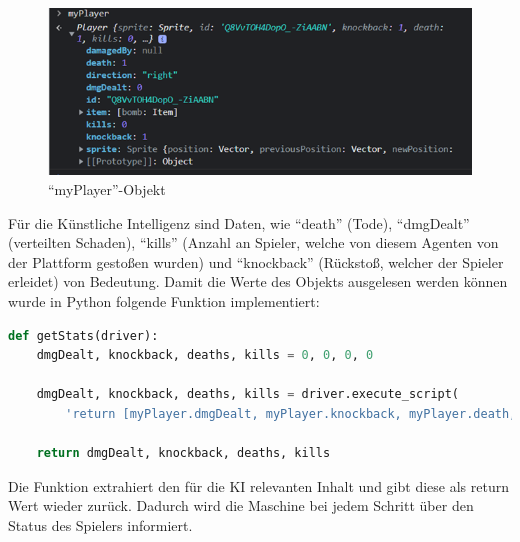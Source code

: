 \begin{figure}[H]
    \centering
    \includegraphics[scale=1]{pics/ai/myPlayer.png}
    \caption{``myPlayer''-Objekt}
    \label{fig:ai:myPlayerPic}
\end{figure}

Für die Künstliche Intelligenz sind Daten, wie ``death'' (Tode), ``dmgDealt'' (verteilten Schaden), ``kills'' (Anzahl an Spieler, welche von diesem Agenten von der Plattform gestoßen wurden) und ``knockback'' (Rückstoß, welcher der Spieler erleidet) von Bedeutung.
Damit die Werte des Objekts ausgelesen werden können wurde in Python folgende Funktion implementiert:

\begin{lstlisting}[language=Python,label=lst:maap:getstats,caption=Informationen über den Spieler]
def getStats(driver):
    dmgDealt, knockback, deaths, kills = 0, 0, 0, 0

    dmgDealt, knockback, deaths, kills = driver.execute_script(
        'return [myPlayer.dmgDealt, myPlayer.knockback, myPlayer.death, myPlayer.kills]')

    return dmgDealt, knockback, deaths, kills
\end{lstlisting}

Die Funktion extrahiert den für die KI relevanten Inhalt und gibt diese als return Wert wieder zurück. Dadurch wird die Maschine bei jedem Schritt über den Status des Spielers informiert.

